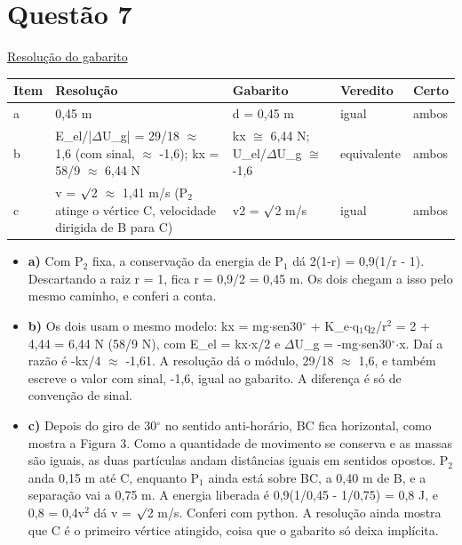 \documentclass{article}%
\begin{document}
\section*{Questão 7}%
\href{https://poliedroresolve.sistemapoliedro.com.br/vestibulares/ime/2027/ime-2-fase-dia-2-27-10-2026-2-fase-dia-2/dissertativa-7-fisica-2-fase-dia-2-ime-2027}{Resolução do gabarito}\par\smallskip%
\begin{longtable}{@{}p{} p{} p{} p{} p{}@{}}\toprule Item & Resolução & Gabarito & Veredito & Certo \\ \midrule
a & 0,45 m & d = 0,45 m & igual & ambos \\
b & E\_el/|$\Delta$U\_g| = 29/18 $\approx$ 1,6 (com sinal, $\approx$ -1,6); kx = 58/9 $\approx$ 6,44 N & kx $\cong$ 6,44 N; U\_el/$\Delta$U\_g $\cong$ -1,6 & equivalente & ambos \\
c & v = $\surd$2 $\approx$ 1,41 m/s (P$_{2}$ atinge o vértice C, velocidade dirigida de B para C) & v2 = $\surd$2 m/s & igual & ambos \\
\bottomrule\end{longtable}%
\begin{itemize}%
\item%
\textbf{a)} Com P$_{2}$ fixa, a conservação da energia de P$_{1}$ dá 2(1-r) = 0,9(1/r - 1). Descartando a raiz r = 1, fica r = 0,9/2 = 0,45 m. Os dois chegam a isso pelo mesmo caminho, e conferi a conta.%
\item%
\textbf{b)} Os dois usam o mesmo modelo: kx = mg$\cdot$sen30$^\circ$ + K\_e$\cdot$q$_{1}$q$_{2}$/r$^2$ = 2 + 4,44 = 6,44 N (58/9 N), com E\_el = kx$\cdot$x/2 e $\Delta$U\_g = -mg$\cdot$sen30$^\circ$$\cdot$x. Daí a razão é -kx/4 $\approx$ -1,61. A resolução dá o módulo, 29/18 $\approx$ 1,6, e também escreve o valor com sinal, -1,6, igual ao gabarito. A diferença é só de convenção de sinal.%
\item%
\textbf{c)} Depois do giro de 30$^\circ$ no sentido anti{-}horário, BC fica horizontal, como mostra a Figura 3. Como a quantidade de movimento se conserva e as massas são iguais, as duas partículas andam distâncias iguais em sentidos opostos. P$_{2}$ anda 0,15 m até C, enquanto P$_{1}$ ainda está sobre BC, a 0,40 m de B, e a separação vai a 0,75 m. A energia liberada é 0,9(1/0,45 - 1/0,75) = 0,8 J, e 0,8 = 0,4v$^2$ dá v = $\surd$2 m/s. Conferi com python. A resolução ainda mostra que C é o primeiro vértice atingido, coisa que o gabarito só deixa implícita.%
\end{itemize}%
\end{document}
